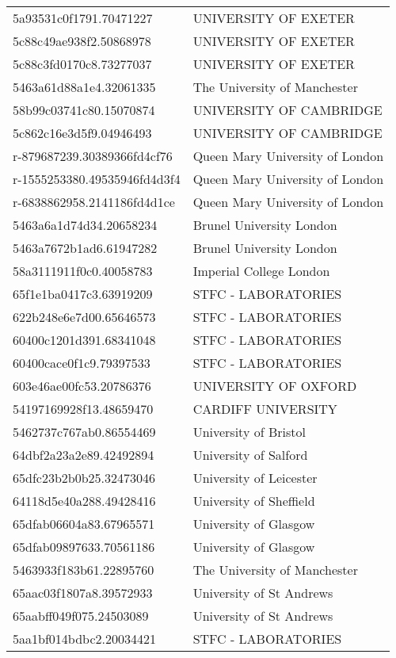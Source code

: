\begin{tabular}{ll}
5a93531c0f1791.70471227 & UNIVERSITY OF EXETER \\
5c88c49ae938f2.50868978 & UNIVERSITY OF EXETER \\
5c88c3fd0170c8.73277037 & UNIVERSITY OF EXETER \\
5463a61d88a1e4.32061335 & The University of Manchester \\
58b99c03741c80.15070874 & UNIVERSITY OF CAMBRIDGE \\
5c862c16e3d5f9.04946493 & UNIVERSITY OF CAMBRIDGE \\
r-879687239.30389366fd4cf76 & Queen Mary University of London \\
r-1555253380.49535946fd4d3f4 & Queen Mary University of London \\
r-6838862958.2141186fd4d1ce & Queen Mary University of London \\
5463a6a1d74d34.20658234 & Brunel University London \\
5463a7672b1ad6.61947282 & Brunel University London \\
58a3111911f0c0.40058783 & Imperial College London \\
65f1e1ba0417c3.63919209 & STFC - LABORATORIES \\
622b248e6e7d00.65646573 & STFC - LABORATORIES \\
60400c1201d391.68341048 & STFC - LABORATORIES \\
60400cace0f1c9.79397533 & STFC - LABORATORIES \\
603e46ae00fc53.20786376 & UNIVERSITY OF OXFORD \\
54197169928f13.48659470 & CARDIFF UNIVERSITY \\
5462737c767ab0.86554469 & University of Bristol \\
64dbf2a23a2e89.42492894 & University of Salford \\
65dfc23b2b0b25.32473046 & University of Leicester \\
64118d5e40a288.49428416 & University of Sheffield \\
65dfab06604a83.67965571 & University of Glasgow \\
65dfab09897633.70561186 & University of Glasgow \\
5463933f183b61.22895760 & The University of Manchester \\
65aac03f1807a8.39572933 & University of St Andrews \\
65aabff049f075.24503089 & University of St Andrews \\
5aa1bf014bdbc2.20034421 & STFC - LABORATORIES \\

\end{tabular}
